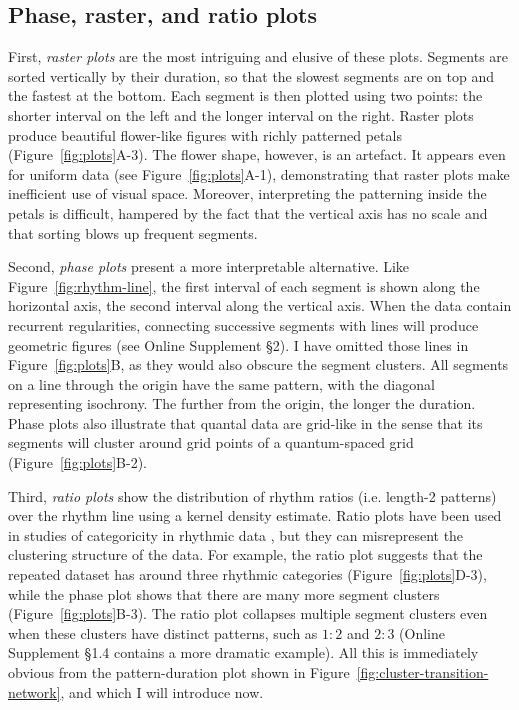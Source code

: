 \documentclass{tMAM2e}%
\theoremstyle{plain}
\theoremstyle{definition}
\theoremstyle{remark}
\newcommand{\suppl}[1]{Online Supplement §#1}
\begin{document}
\subsection{Phase, raster, and ratio plots}
First, \emph{raster plots} \citep[][see Figure~\ref{fig:plots}A]{Roeske2020CurrBiol} are the most intriguing and elusive of these plots. 
Segments are sorted vertically by their duration, so that the slowest segments are on top and the fastest at the bottom. 
Each segment is then plotted using two points: the shorter interval on the left and the longer interval on the right. 
Raster plots produce beautiful flower-like figures with richly patterned petals (Figure~\ref{fig:plots}A-3). 
The flower shape, however, is an artefact. 
It appears even for uniform data (see Figure~\ref{fig:plots}A-1), demonstrating that raster plots make inefficient use of visual space. 
Moreover, interpreting the patterning inside the petals is difficult, hampered by the fact that the vertical axis has no scale and that sorting blows up frequent segments.

Second, \emph{phase plots} \citep[][see Figure~\ref{fig:plots}B]{Ravignani2017MusicPercept,Ravignani2016NatHumBehav} present a more interpretable alternative. 
Like Figure~\ref{fig:rhythm-line}, the first interval of each segment is shown along the horizontal axis, the second interval along the vertical axis. 
When the data contain recurrent regularities, connecting successive segments with lines will produce geometric figures (see \suppl{2}).
I have omitted those lines in Figure~\ref{fig:plots}B, as they would also obscure the segment clusters. 
All segments on a line through the origin have the same pattern, with the diagonal representing isochrony. 
The further from the origin, the longer the duration. 
Phase plots also illustrate that quantal data are grid-like in the sense that its segments will cluster around grid points of a quantum-spaced grid (Figure~\ref{fig:plots}B-2).

Third, \emph{ratio plots} \citep[][see Figure~\ref{fig:plots}D]{Roeske2020CurrBiol} show the distribution of rhythm ratios (i.e. length-2 patterns) over the rhythm line using a kernel density estimate. 
Ratio plots have been used in studies of categoricity in rhythmic data \citep[e.g.]{DeGregorio2021CurrBiol}, but they can misrepresent the clustering structure of the data. 
For example, the ratio plot suggests that the repeated dataset has around three rhythmic categories (Figure~\ref{fig:plots}D-3), while the phase plot shows that there are many more segment clusters (Figure~\ref{fig:plots}B-3). 
The ratio plot collapses multiple segment clusters even when these clusters have distinct patterns, such as $1 : 2$ and $2 : 3$ (\suppl{1.4} contains a more dramatic example).
All this is immediately obvious from the pattern-duration plot shown in Figure~\ref{fig:cluster-transition-network}, and which I will introduce now.
\end{document}
